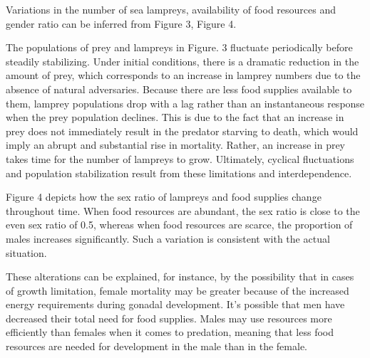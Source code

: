 \documentclass[12pt]{article}  %
\begin{document}
	Variations in the number of sea lampreys, availability of food resources and gender ratio can be inferred from Figure 3, Figure 4. \par
The populations of prey and lampreys in Figure. 3 fluctuate periodically before steadily stabilizing. Under initial conditions, there is a dramatic reduction in the amount of prey, which corresponds to an increase in lamprey numbers due to the absence of natural adversaries. Because there are less food supplies available to them, lamprey populations drop with a lag rather than an instantaneous response when the prey population declines. This is due to the fact that an increase in prey does not immediately result in the predator starving to death, which would imply an abrupt and substantial rise in mortality. Rather, an increase in prey takes time for the number of lampreys to grow. Ultimately, cyclical fluctuations and population stabilization result from these limitations and interdependence.\par
Figure 4 depicts how the sex ratio of lampreys and food supplies change throughout time. When food resources are abundant, the sex ratio is close to the even sex ratio of 0.5, whereas when food resources are scarce, the proportion of males increases significantly. Such a variation is consistent with the actual situation. \par
These alterations can be explained, for instance, by the possibility that in cases of growth limitation, female mortality may be greater because of the increased energy requirements during gonadal development. It's possible that men have decreased their total need for food supplies. Males may use resources more efficiently than females when it comes to predation, meaning that less food resources are needed for development in the male than in the female.
\end{document}

